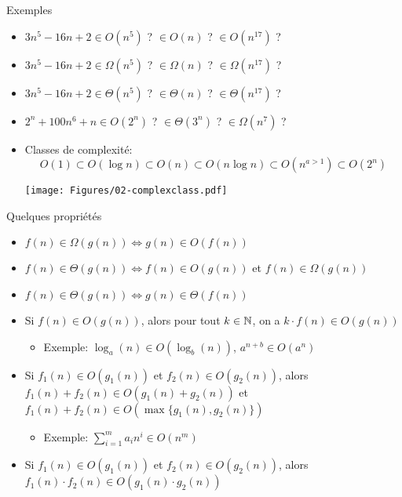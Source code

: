 \begin{frame}{Exemples}
\begin{itemize}
\item $3n^5-16n+2\in O(n^5)$ ? $\in O(n)$ ? $\in O(n^{17})$ ?
\item $3n^5-16n+2\in \Omega(n^5)$ ? $\in \Omega(n)$ ? $\in \Omega(n^{17})$ ?
\item $3n^5-16n+2\in \Theta(n^5)$ ? $\in \Theta(n)$ ? $\in \Theta(n^{17})$ ?
\item $2^n+100n^6+n \in O(2^n)$ ? $\in \Theta(3^n)$ ? $\in \Omega(n^7)$ ?

\bigskip

\item Classes de complexité:
$$O(1)\subset O(\log n)\subset O(n) \subset O(n\log n) \subset O(n^{a>1})\subset O(2^n)$$
\centerline{\texttt{[image: Figures/02-complexclass.pdf]}}
\end{itemize}


\end{frame}

\begin{frame}{Quelques propriétés}
\small
\begin{itemize}
\item $f(n)\in\Omega(g(n)) \Leftrightarrow g(n)\in O(f(n))$
\item $f(n)\in\Theta(g(n))\Leftrightarrow f(n)\in O(g(n))$ et $f(n)\in \Omega(g(n))$
\item $f(n)\in\Theta(g(n))\Leftrightarrow g(n)\in\Theta(f(n))$
\bigskip
\item Si $f(n)\in O(g(n))$, alors pour tout $k\in \mathbb{N}$, on a $k\cdot f(n)\in O(g(n))$
\begin{itemize}
\item Exemple: $\log_a(n)\in O(\log_b(n))$, $a^{n+b}\in O(a^n)$
\end{itemize}
\item Si $f_1(n)\in O(g_1(n))$ et $f_2(n)\in O(g_2(n))$, alors $f_1(n)+f_2(n)\in O(g_1(n)+g_2(n))$ et $f_1(n)+f_2(n)\in O(\max\{g_1(n),g_2(n)\})$
\begin{itemize}
\item Exemple: $\sum_{i=1}^m a_i n^i\in O(n^m)$
\end{itemize}
\item Si $f_1(n)\in O(g_1(n))$ et $f_2(n)\in O(g_2(n))$, alors $f_1(n)\cdot f_2(n)\in O(g_1(n)\cdot g_2(n))$
\end{itemize}
\end{frame}


